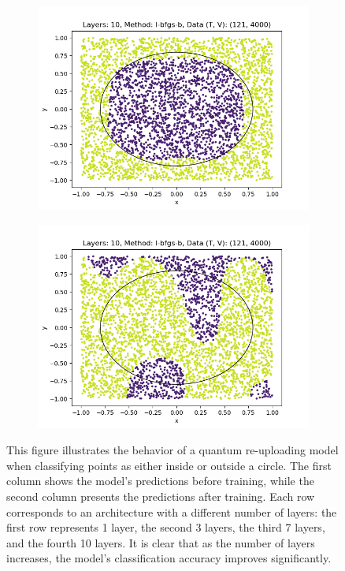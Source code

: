 \begin{figure}[h]
\begin{subfigure}[b]{0.45\textwidth}
        \includegraphics[width=\textwidth]{sections/chapters/Quantum-Machine-Learning/Images/Data-Re-Uploading/Layer10-A.png}
    \end{subfigure}
    \begin{subfigure}[b]{0.45\textwidth}
        \centering
        \includegraphics[width=\textwidth]{sections/chapters/Quantum-Machine-Learning/Images/Data-Re-Uploading/Layer10-B.png}
    \end{subfigure}
    \caption{This figure illustrates the behavior of a quantum re-uploading model when classifying points 
    as either inside or outside a circle. The first column shows the model's predictions before training, 
    while the second column presents the predictions after training. Each row corresponds to an architecture 
    with a different number of layers: the first row represents 1 layer, the second 3 layers, the third 7 
    layers, and the fourth 10 layers. It is clear that as the number of layers increases, the model's 
    classification accuracy improves significantly.}
    \label{fig:reuploading-exp}
\end{figure}


